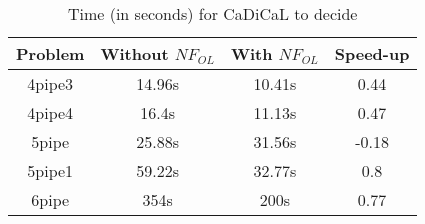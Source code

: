 \documentclass[a4paper, 11pt]{article}
\begin{document}
    \begin{table}[h]
	    \begin{center}
		    \begin{tabular}{|| c || c c c||}
			    \hline
			    Problem&Without $NF_{OL}$&With $NF_{OL}$&Speed-up\\
			    \hline
			    4pipe3 & 14.96s & 10.41s&0.44\\\hline
			    4pipe4 & 16.4s & 11.13s&0.47\\\hline
			    5pipe & 25.88s & 31.56s&-0.18\\\hline
			    5pipe1 & 59.22s & 32.77s&0.8\\\hline
			    6pipe & 354s & 200s&0.77\\
			    \hline
		    \end{tabular}
		    \caption{Time (in seconds) for CaDiCaL to decide}
	    \end{center}
    \end{table}
\end{document}
